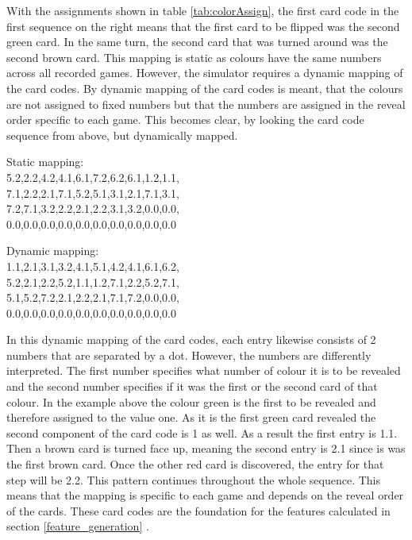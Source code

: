 \begin{minipage}{0.5\textwidth}
	With the assignments shown in table \ref{tab:colorAssign}, the first card code in the first sequence on the right means that the first card to be flipped was the second green card. In the same turn, the second card that was turned around was the second brown card. This mapping is static as colours have the same numbers across all recorded games. However, the simulator requires a dynamic mapping of the card codes. By dynamic mapping of the card codes is meant, that the colours are not assigned to fixed numbers but that the numbers are assigned in the reveal order specific to each game. This becomes clear, by looking the card code sequence from above, but dynamically mapped.
\end{minipage}
\begin{minipage}{0.5\textwidth}
	\begin{center}
		Static mapping:\\
		5.2,2.2,4.2,4.1,6.1,7.2,6.2,6.1,1.2,1.1,\\
		7.1,2.2,2.1,7.1,5.2,5.1,3.1,2.1,7.1,3.1,\\
		7.2,7.1,3.2,2.2,2.1,2.2,3.1,3.2,0.0,0.0,\\
		0.0,0.0,0.0,0.0,0.0,0.0,0.0,0.0,0.0,0.0
		
		
		\begin{center}
			Dynamic mapping:\\
			1.1,2.1,3.1,3.2,4.1,5.1,4.2,4.1,6.1,6.2,\\
			5.2,2.1,2.2,5.2,1.1,1.2,7.1,2.2,5.2,7.1,\\
			5.1,5.2,7.2,2.1,2.2,2.1,7.1,7.2,0.0,0.0,\\
			0.0,0.0,0.0,0.0,0.0,0.0,0.0,0.0,0.0,0.0
		\end{center}
	\end{center}
\end{minipage}


In this dynamic mapping of the card codes, each entry likewise consists of 2 numbers that are separated by a dot. However, the numbers are differently interpreted. The first number specifies what number of colour it is to be revealed and the second number specifies if it was the first or the second card of that colour. In the example above the colour green is the first to be revealed and therefore assigned to the value one. As it is the first green card revealed the second component of the card code is 1 as well. As a result the first entry is 1.1. Then a brown card is turned face up, meaning the second entry is 2.1 since is was the first brown card. Once the other red card is discovered, the entry for that step will be 2.2. This pattern continues throughout the whole sequence. This means that the mapping is specific to each game and depends on the reveal order of the cards. These card codes are the foundation for the features calculated in section \ref{feature_generation} .

